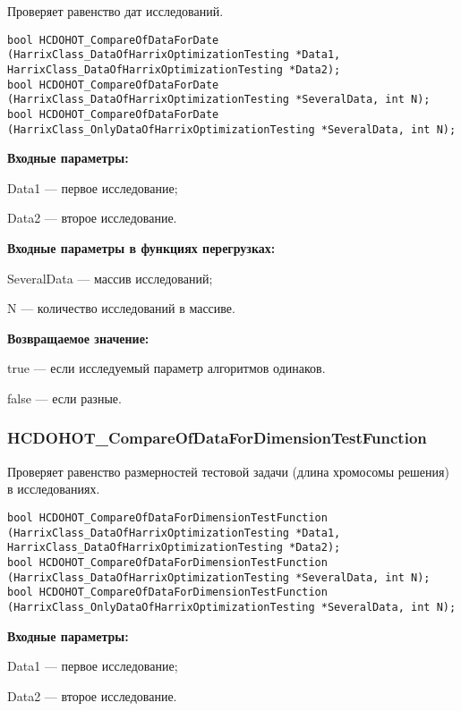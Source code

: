 \documentclass[a4paper,12pt]{article}
\begin{document}
Проверяет равенство дат исследований.


\begin{lstlisting}[label=code_syntax_HCDOHOT_CompareOfDataForDate,caption=Синтаксис]
bool HCDOHOT_CompareOfDataForDate (HarrixClass_DataOfHarrixOptimizationTesting *Data1, HarrixClass_DataOfHarrixOptimizationTesting *Data2);
bool HCDOHOT_CompareOfDataForDate (HarrixClass_DataOfHarrixOptimizationTesting *SeveralData, int N);
bool HCDOHOT_CompareOfDataForDate (HarrixClass_OnlyDataOfHarrixOptimizationTesting *SeveralData, int N);
\end{lstlisting}

\textbf{Входные параметры:}

Data1 --- первое исследование;
 
Data2 --- второе исследование.
	 
\textbf{Входные параметры в функциях перегрузках:}

SeveralData --- массив исследований;
 
N --- количество исследований в массиве.

\textbf{Возвращаемое значение:}

true --- если исследуемый параметр алгоритмов одинаков.
 
false --- если разные.


\subsubsection{HCDOHOT\_CompareOfDataForDimensionTestFunction}\label{HCDOHOT_CompareOfDataForDimensionTestFunction}

Проверяет равенство размерностей тестовой задачи (длина хромосомы решения) в исследованиях.


\begin{lstlisting}[label=code_syntax_HCDOHOT_CompareOfDataForDimensionTestFunction,caption=Синтаксис]
bool HCDOHOT_CompareOfDataForDimensionTestFunction (HarrixClass_DataOfHarrixOptimizationTesting *Data1, HarrixClass_DataOfHarrixOptimizationTesting *Data2);
bool HCDOHOT_CompareOfDataForDimensionTestFunction (HarrixClass_DataOfHarrixOptimizationTesting *SeveralData, int N);
bool HCDOHOT_CompareOfDataForDimensionTestFunction (HarrixClass_OnlyDataOfHarrixOptimizationTesting *SeveralData, int N);
\end{lstlisting}

\textbf{Входные параметры:}

Data1 --- первое исследование;
 
Data2 --- второе исследование.
	 
\end{document}
